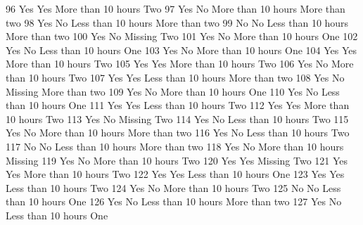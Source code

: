 \documentclass[
  letterpaper,
  DIV=11,
  numbers=noendperiod]{scrreprt}
\newenvironment{Shaded}{\begin{snugshade}}{\end{snugshade}}
\newcommand{\NormalTok}[1]{\textcolor[rgb]{0.00,0.23,0.31}{#1}}
\begin{document}
\begin{Shaded}
\begin{Highlighting}[]
\NormalTok{96                Yes            Yes More than 10 hours           Two}
\NormalTok{97                Yes             No More than 10 hours More than two}
\NormalTok{98                Yes             No Less than 10 hours More than two}
\NormalTok{99                 No             No Less than 10 hours More than two}
\NormalTok{100               Yes             No            Missing           Two}
\NormalTok{101               Yes             No More than 10 hours           One}
\NormalTok{102               Yes             No Less than 10 hours           One}
\NormalTok{103               Yes             No More than 10 hours           One}
\NormalTok{104               Yes            Yes More than 10 hours           Two}
\NormalTok{105               Yes            Yes More than 10 hours           Two}
\NormalTok{106               Yes             No More than 10 hours           Two}
\NormalTok{107               Yes            Yes Less than 10 hours More than two}
\NormalTok{108               Yes             No            Missing More than two}
\NormalTok{109               Yes             No More than 10 hours           One}
\NormalTok{110               Yes             No Less than 10 hours           One}
\NormalTok{111               Yes            Yes Less than 10 hours           Two}
\NormalTok{112               Yes            Yes More than 10 hours           Two}
\NormalTok{113               Yes             No            Missing           Two}
\NormalTok{114               Yes             No Less than 10 hours           Two}
\NormalTok{115               Yes             No More than 10 hours More than two}
\NormalTok{116               Yes             No Less than 10 hours           Two}
\NormalTok{117                No             No Less than 10 hours More than two}
\NormalTok{118               Yes             No More than 10 hours       Missing}
\NormalTok{119               Yes             No More than 10 hours           Two}
\NormalTok{120               Yes            Yes            Missing           Two}
\NormalTok{121               Yes            Yes More than 10 hours           Two}
\NormalTok{122               Yes            Yes Less than 10 hours           One}
\NormalTok{123               Yes            Yes Less than 10 hours           Two}
\NormalTok{124               Yes             No More than 10 hours           Two}
\NormalTok{125                No             No Less than 10 hours           One}
\NormalTok{126               Yes             No Less than 10 hours More than two}
\NormalTok{127               Yes             No Less than 10 hours           One}

\end{Highlighting}
\end{Shaded}
\end{document}
